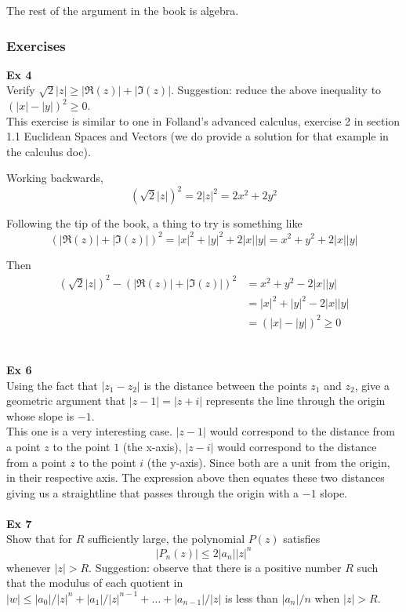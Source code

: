 The rest of the argument in the book is algebra.

\subsubsection{Exercises}

\textbf{Ex 4}
\\
Verify $\sqrt{2}|z| \geq |\Re(z)| + |\Im(z)|$.
Suggestion: reduce the above inequality to $(|x| - |y|)^2 \geq 0$.
\\

This exercise is similar to one in Folland's advanced calculus, exercise 2 in section 1.1 Euclidean Spaces and Vectors
(we do provide a solution for that example in the calculus doc).

Working backwards,
$$
(\sqrt{2} |z|)^2 = 2|z|^2 = 2x^2 + 2y^2
$$

Following the tip of the book, a thing to try is something like
$$
(|\Re(z)| + |\Im(z)|)^2 = |x|^2 + |y|^2 + 2|x||y| = x^2 + y^2 + 2|x||y|
$$

Then
\begin{align*}
(\sqrt{2} |z|)^2  -  (|\Re(z)| + |\Im(z)|)^2 &= x^2 + y^2 - 2|x||y| \\
&= |x|^2 + |y|^2 - 2|x||y| \\
&= (|x| - |y|)^2 \geq 0
\end{align*}
\\~\\


\textbf{Ex 6}
\\
Using the fact that $|z_1 - z_2|$ is the distance between the points $z_1$ and $z_2$,
give a geometric argument that $|z - 1| = |z + i|$ represents the line through the origin
whose slope is $-1$.
\\

This one is a very interesting case.
$|z-1|$ would correspond to the distance from a point $z$ to the point $1$ (the x-axis),
$|z-i|$ would correspond to the distance from a point $z$ to the point $i$ (the y-axis).
Since both are a unit from the origin, in their respective axis.
The expression above then equates these two distances giving us a straightline that passes through
the origin with a $-1$ slope.
\\~\\

\textbf{Ex 7}
\\
Show that for $R$ sufficiently large, the polynomial $P(z)$ satisfies
$$
|P_n(z)| \leq 2 |a_n||z|^n
$$
whenever $|z| > R$.
Suggestion: observe that there is a positive number $R$ such that the modulus
of each quotient in $|w| \leq |a_0|/|z|^n + |a_1|/|z|^{n-1} + \ldots + |a_{n-1}|/|z|$
is less than $|a_n|/n$ when $|z| > R$.
\\

